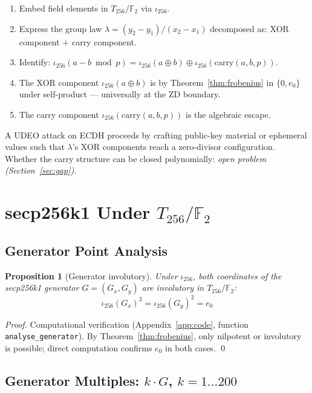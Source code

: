 \documentclass[runningheads]{llncs}
\theoremstyle{plain}
\newtheorem{proposition}[theorem]{Proposition}
\theoremstyle{definition}
\newcommand{\GFtwo}{\mathbb{F}_2}
\begin{document}
\begin{enumerate}
\item Embed field elements in $T_{256}/\GFtwo$ via $\iota_{256}$.
\item Express the group law $\lambda = (y_2 - y_1)/(x_2 - x_1)$ decomposed as:
      XOR component $+$ carry component.
\item Identify: $\iota_{256}(a - b \bmod p) = \iota_{256}(a \oplus b) \oplus \iota_{256}(\mathrm{carry}(a,b,p))$.
\item The XOR component $\iota_{256}(a \oplus b)$ is by Theorem~\ref{thm:frobenius}
      in $\{0, e_0\}$ under self-product — universally at the ZD boundary.
\item The carry component $\iota_{256}(\mathrm{carry}(a,b,p))$ is the algebraic escape.
\end{enumerate}

A UDEO attack on ECDH proceeds by crafting public-key material or ephemeral
values such that $\lambda$'s XOR components reach a zero-divisor configuration.
Whether the carry structure can be closed polynomially: \emph{open problem
(Section~\ref{sec:gap})}.


\section{secp256k1 Under $T_{256}/\GFtwo$}
\label{sec:secp256k1}

\subsection{Generator Point Analysis}

\begin{proposition}[Generator involutory]
\label{prop:ginvol}
Under $\iota_{256}$, both coordinates of the secp256k1 generator $G = (G_x, G_y)$
are involutory in $T_{256}/\GFtwo$:
\[
\iota_{256}(G_x)^2 = \iota_{256}(G_y)^2 = e_0
\]
\end{proposition}

\begin{proof}
Computational verification (Appendix~\ref{app:code}, function \texttt{analyse\_generator}).
By Theorem~\ref{thm:frobenius}, only nilpotent or involutory is possible;
direct computation confirms $e_0$ in both cases. \qed
\end{proof}

\subsection{Generator Multiples: $k \cdot G$, $k = 1 \ldots 200$}
\end{document}
